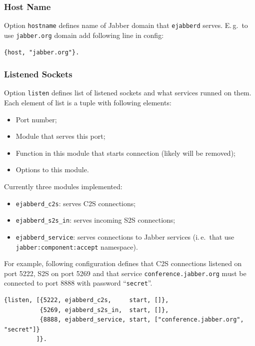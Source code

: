 \documentclass[10pt]{article}
\newcommand{\ejabberd}{\texttt{ejabberd}}
\newcommand{\Jabber}{Jabber}
\begin{document}
\subsubsection{Host Name}
\label{sec:confighostname}

Option \texttt{hostname} defines name of \Jabber{} domain that \ejabberd{}
serves.  E.\,g.\ to use \texttt{jabber.org} domain add following line in config:
\begin{verbatim}
{host, "jabber.org"}.
\end{verbatim}




\subsubsection{Listened Sockets}
\label{sec:configlistened}

Option \texttt{listen} defines list of listened sockets and what services
runned on them.  Each element of list is a tuple with following elements:
\begin{itemize}
\item Port number;
\item Module that serves this port;
\item Function in this module that starts connection (likely will be removed);
\item Options to this module.
\end{itemize}

Currently three modules implemented:
\begin{itemize}
\item \texttt{ejabberd\_c2s}: serves C2S connections;
\item \texttt{ejabberd\_s2s\_in}: serves incoming S2S connections;
\item \texttt{ejabberd\_service}: serves connections to \Jabber{} services
  (i.\,e.\ that use \texttt{jabber:component:accept} namespace).
\end{itemize}

For example, following configuration defines that C2S connections listened on
port 5222, S2S on port 5269 and that service \texttt{conference.jabber.org}
must be connected to port 8888 with password ``\texttt{secret}''.

\begin{verbatim}
{listen, [{5222, ejabberd_c2s,     start, []},
          {5269, ejabberd_s2s_in,  start, []},
          {8888, ejabberd_service, start, ["conference.jabber.org", "secret"]}
         ]}.
\end{verbatim}
\end{document}
